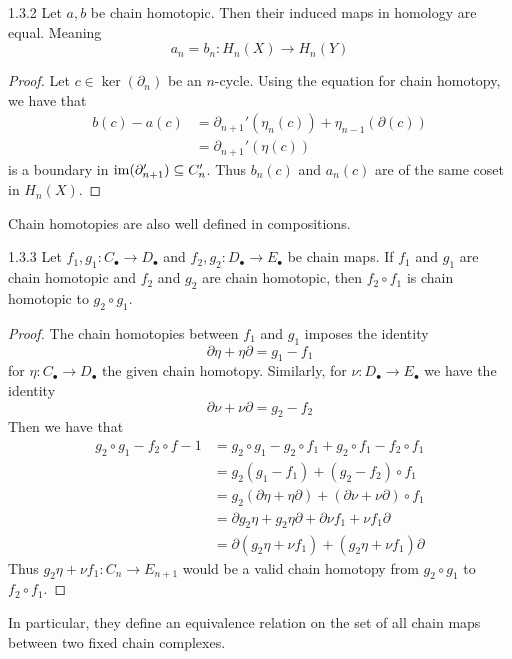 \documentclass[a4paper]{article}
\begin{document}
\begin{lmm}{}{1.3.2} Let $a,b$ be chain homotopic. Then their induced maps in homology are equal. Meaning $$a_n=b_n:H_n(X)\to H_n(Y)$$ \tcbline
\begin{proof}
Let $c\in\ker(\partial_n)$ be an $n$-cycle. Using the equation for chain homotopy, we have that 
\begin{align*}
b(c)-a(c)&=\partial_{n+1}'(\eta_n(c))+\eta_{n-1}(\partial(c))\\
&=\partial_{n+1}'(\eta(c))
\end{align*}
 is a boundary in $\operatorname{im}(\partial_{n+1}')\subseteq C_n'$. Thus $b_n(c)$ and $a_n(c)$ are of the same coset in $H_n(X)$. 
\end{proof}
\end{lmm}

Chain homotopies are also well defined in compositions. 

\begin{prp}{}{1.3.3} Let $f_1,g_1:C_\bullet\to D_\bullet$ and $f_2,g_2:D_\bullet\to E_\bullet$ be chain maps. If $f_1$ and $g_1$ are chain homotopic and $f_2$ and $g_2$ are chain homotopic, then $f_2\circ f_1$ is chain homotopic to $g_2\circ g_1$. \tcbline
\begin{proof}
The chain homotopies between $f_1$ and $g_1$ imposes the identity $$\partial\eta+\eta\partial=g_1-f_1$$ for $\eta:C_\bullet\to D_\bullet$ the given chain homotopy. Similarly, for $\nu:D_\bullet\to E_\bullet$ we have the identity $$\partial\nu+\nu\partial=g_2-f_2$$ Then we have that 
\begin{align*}
g_2\circ g_1-f_2\circ f-1&=g_2\circ g_1-g_2\circ f_1+g_2\circ f_1-f_2\circ f_1\\
&=g_2(g_1-f_1)+(g_2-f_2)\circ f_1\\
&=g_2(\partial\eta+\eta\partial)+(\partial\nu+\nu\partial)\circ f_1\\
&=\partial g_2\eta+g_2\eta\partial+\partial\nu f_1+\nu f_1\partial\\
&=\partial(g_2\eta+\nu f_1)+(g_2\eta+\nu f_1)\partial
\end{align*}
Thus $g_2\eta+\nu f_1:C_n\to E_{n+1}$ would be a valid chain homotopy from $g_2\circ g_1$ to $f_2\circ f_1$. 
\end{proof}
\end{prp}

In particular, they define an equivalence relation on the set of all chain maps between two fixed chain complexes. 
\end{document}
